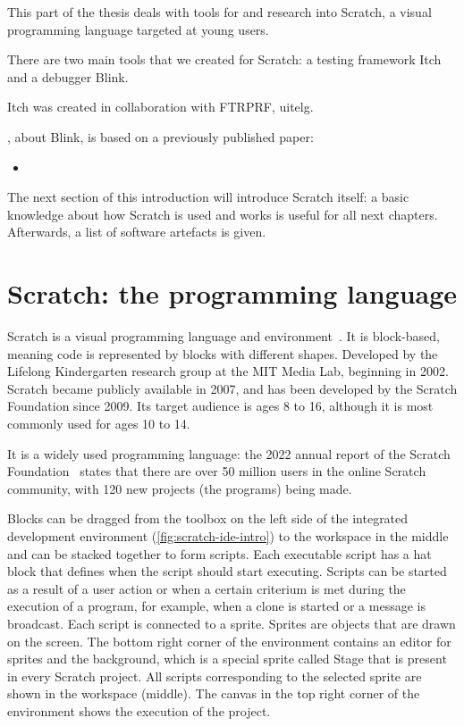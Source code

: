 \documentclass[./main]{subfiles}
\begin{document}
This part of the thesis deals with tools for and research into Scratch, a visual programming language targeted at young users.

There are two main tools that we created for Scratch: a testing framework Itch and a debugger Blink.

Itch was created in collaboration with FTRPRF, uitelg.

, about Blink, is based on a previously published paper:

\begin{itemize}
    \item {}
\end{itemize}

The next section of this introduction will introduce Scratch itself: a basic knowledge about how Scratch is used and works is useful for all next chapters.
Afterwards, a list of software artefacts is given.

\chapter{Scratch: the programming language}\label{ch:scratch-the-programming-language}

Scratch is a visual programming language and environment~\autocite{resnickScratchProgrammingAll2009}.
It is block-based, meaning code is represented by blocks with different shapes.
Developed by the Lifelong Kindergarten research group at the MIT Media Lab, beginning in 2002.
Scratch became publicly available in 2007, and has been developed by the Scratch Foundation since 2009.
Its target audience is ages 8 to 16, although it is most commonly used for ages 10 to 14.

It is a widely used programming language: the 2022 annual report of the Scratch Foundation~\autocite{GrowingGlobalCreative2022} states that there are over 50 million users in the online Scratch community, with 120 new projects (the programs) being made.

Blocks can be dragged from the toolbox on the left side of the integrated development environment (\vref{fig:scratch-ide-intro}) to the workspace in the middle and can be stacked together to form scripts.
Each executable script has a hat block that defines when the script should start executing.
Scripts can be started as a result of a user action or when a certain criterium is met during the execution of a program, for example, when a clone is started or a message is broadcast.
Each script is connected to a sprite.
Sprites are objects that are drawn on the screen.
The bottom right corner of the environment contains an editor for sprites and the background, which is a special sprite called Stage that is present in every Scratch project.
All scripts corresponding to the selected sprite are shown in the workspace (middle).
The canvas in the top right corner of the environment shows the execution of the project.
\end{document}
